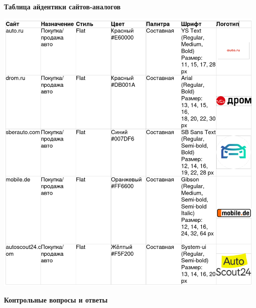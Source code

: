 \textbf{Таблица айдентики сайтов-аналогов}
\bigskip

\noindent
\begin{minipage}{\linewidth}
    \includegraphics[width=\linewidth]{table}
\end{minipage}
\bigskip

\textbf{Контрольные вопросы и ответы}

